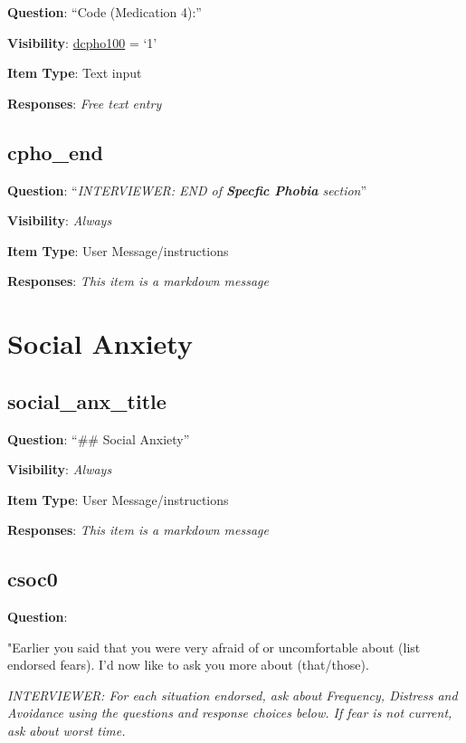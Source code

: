 \documentclass[]{book}
\begin{document}
\textbf{Question}: ``Code (Medication 4):''

\textbf{Visibility}: \protect\hyperlink{dcpho100}{dcpho100} = `1'

\textbf{Item Type}: Text input

\textbf{Responses}: \emph{Free text entry}

\hypertarget{cpho_end}{%
\section{cpho\_end}\label{cpho_end}}

\textbf{Question}: ``\emph{INTERVIEWER: END of \textbf{Specfic Phobia} section}''

\textbf{Visibility}: \emph{Always}

\textbf{Item Type}: User Message/instructions

\textbf{Responses}: \emph{This item is a markdown message}

\hypertarget{social_anxiety}{%
\chapter{Social Anxiety}\label{social_anxiety}}

\hypertarget{social_anx_title}{%
\section{social\_anx\_title}\label{social_anx_title}}

\textbf{Question}: ``\#\# Social Anxiety''

\textbf{Visibility}: \emph{Always}

\textbf{Item Type}: User Message/instructions

\textbf{Responses}: \emph{This item is a markdown message}

\hypertarget{csoc0}{%
\section{csoc0}\label{csoc0}}

\textbf{Question}:

"Earlier you said that you were very afraid of or uncomfortable about (list endorsed fears). I'd now like to ask you more about (that/those).

\emph{INTERVIEWER: For each situation endorsed, ask about Frequency, Distress and Avoidance using the questions and response choices below. If fear is not current, ask about worst time. }
\end{document}
